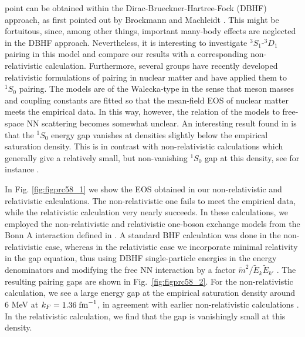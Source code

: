 \documentclass[rmp,aps,floatfix]{revtex4}
\begin{document}
point can be obtained within the Dirac-Brueckner-Hartree-Fock (DBHF) approach, 
as first pointed out by Brockmann and Machleidt \cite{brock90}.    
This might be fortuitous, since, among other things,  
important many-body effects are neglected 
in the DBHF approach.  Nevertheless, it is interesting to investigate 
$^3S_1$-$^3D_1$ pairing in this model and compare our results with a  
corresponding non-relativistic calculation.
Furthermore, several groups have recently developed 
relativistic formulations of 
pairing in nuclear matter \cite{ring91,guim96,matera97,milena2001} and have   
applied them to $^1S_0$ pairing.  
The models are of the Walecka-type \cite{sw86} in the sense that 
meson masses and coupling constants are fitted 
so that the mean-field EOS of nuclear 
matter meets the empirical data.  In this way, however, the relation of 
the models to free-space NN scattering becomes somewhat unclear.  
An interesting result found in  \cite{ring91,guim96,matera97} 
is that the $^1S_0$ energy gap vanishes at densities slightly below the 
empirical saturation density.  This is in contrast with 
non-relativistic calculations which generally give a relatively small, 
but non-vanishing $^1S_0$ gap at this density, see for instance  
\cite{kuch89,bcll90,chen93,elg961}.   

In Fig. \ref{fig:figprc58_1} we show the EOS obtained in our non-relativistic 
and relativistic calculations.   The non-relativistic one fails to 
meet the empirical data, while the relativistic calculation very nearly 
succeeds. 
In these calculations, we employed the non-relativistic and relativistic
one-boson exchange models from the 
Bonn A interaction  defined in \cite{mach89}.  
A standard BHF calculation was done in the non-relativistic case, whereas
in the relativistic case we incorporate 
minimal relativity in the gap equation, thus using DBHF single-particle 
energies in the energy denominators and modifying the free NN interaction 
by a factor $\tilde{m}^2/\tilde{E}_k\tilde{E}_{k'}$ \cite{pair1}.  
The resulting pairing gaps are shown in 
Fig.\ \ref{fig:figprc58_2}.   For the non-relativistic 
calculation, we see a 
large energy gap at the empirical saturation density around $6$ MeV 
at $k_F=1.36\;{\rm fm}^{-1}$, in agreement with  
earlier non-relativistic calculations 
\cite{alm90,vonder91,taka93,bls95}.  
In the relativistic calculation,
we find that the gap is vanishingly small  at this density.  
\end{document}

